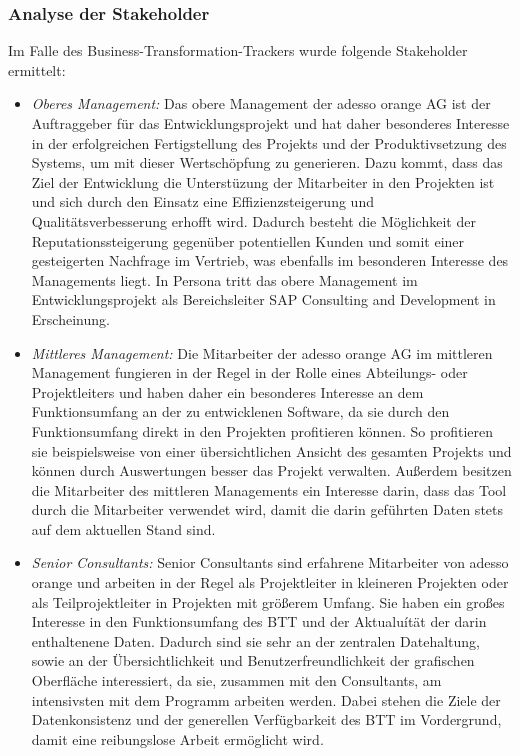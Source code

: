 \subsubsection{Analyse der Stakeholder}
Im Falle des Business-Transformation-Trackers wurde folgende Stakeholder ermittelt:
\begin{itemize}
    \item[] \emph{Oberes Management:} Das obere Management der adesso orange AG ist der Auftraggeber für das Entwicklungsprojekt und hat daher besonderes Interesse in der erfolgreichen Fertigstellung des Projekts und der Produktivsetzung des Systems, um mit dieser Wertschöpfung zu generieren. Dazu kommt, dass das Ziel der Entwicklung die Unterstüzung der Mitarbeiter in den Projekten ist und sich durch den Einsatz eine Effizienzsteigerung und Qualitätsverbesserung erhofft wird. Dadurch besteht die Möglichkeit der Reputationssteigerung gegenüber potentiellen Kunden und somit einer gesteigerten Nachfrage im Vertrieb, was ebenfalls im besonderen Interesse des Managements liegt. In Persona tritt das obere Management im Entwicklungsprojekt als Bereichsleiter \glqq{}SAP Consulting and Development\grqq{} in Erscheinung.
    \item[] \emph{Mittleres Management:} Die Mitarbeiter der adesso orange AG im mittleren Management fungieren in der Regel in der Rolle eines Abteilungs- oder Projektleiters und haben daher ein besonderes Interesse an dem Funktionsumfang an der zu entwicklenen Software, da sie durch den Funktionsumfang direkt in den Projekten profitieren können. So profitieren sie beispielsweise von einer übersichtlichen Ansicht des gesamten Projekts und können durch Auswertungen besser das Projekt verwalten. Außerdem besitzen die Mitarbeiter des mittleren Managements ein Interesse darin, dass das Tool durch die Mitarbeiter verwendet wird, damit die darin geführten Daten stets auf dem aktuellen Stand sind. 
    \item[] \emph{Senior Consultants:} Senior Consultants sind erfahrene Mitarbeiter von adesso orange und arbeiten in der Regel als Projektleiter in kleineren Projekten oder als Teilprojektleiter in Projekten mit größerem Umfang. Sie haben ein großes Interesse in den Funktionsumfang des BTT und der Aktualuítät der darin enthaltenene Daten. Dadurch sind sie sehr an der zentralen Datehaltung, sowie an der Übersichtlichkeit und Benutzerfreundlichkeit der grafischen Oberfläche interessiert, da sie, zusammen mit den Consultants, am intensivsten mit dem Programm arbeiten werden. Dabei stehen die Ziele der Datenkonsistenz und der generellen Verfügbarkeit des BTT im Vordergrund, damit eine reibungslose Arbeit ermöglicht wird.

\end{itemize}
